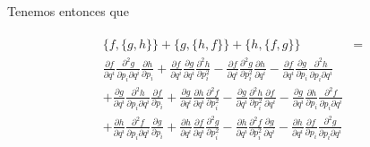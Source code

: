 \documentclass[a4paper,10pt]{article}
\numberwithin{equation}{section}
\begin{document}
Tenemos entonces que 

\begin{align}
\begin{split}
  \{f,\{g,h\}\} + \{g,\{h,f\}\} + \{h,\{f,g\}\} &= \\
  \frac{\partial f}{\partial q^i}
  \frac{\partial^2 g}{\partial p_i\partial q^i}\frac{\partial h}{\partial p_i} 
  + \frac{\partial f}{\partial q^i}
  \frac{\partial g}{\partial q^i}\frac{\partial^2 h}{\partial p_i^2} 
  -\frac{\partial f}{\partial q^i}
  \frac{\partial^2 g}{\partial p_i^2}\frac{\partial h}{\partial q^i} 
  -\frac{\partial f}{\partial q^i} 
  \frac{\partial g}{\partial p_i}\frac{\partial^2 h}{\partial p_i \partial q^i} \\
  + \frac{\partial g}{\partial q^i}
  \frac{\partial^2 h}{\partial p_i\partial q^i}\frac{\partial f}{\partial p_i} 
  + \frac{\partial g}{\partial q^i}
  \frac{\partial h}{\partial q^i}\frac{\partial^2 f}{\partial p_i^2} 
  -\frac{\partial g}{\partial q^i}
  \frac{\partial^2 h}{\partial p_i^2}\frac{\partial f}{\partial q^i} 
  -\frac{\partial g}{\partial q^i} 
  \frac{\partial h}{\partial p_i}\frac{\partial^2 f}{\partial p_i \partial q^i} \\
  + \frac{\partial h}{\partial q^i}
  \frac{\partial^2 f}{\partial p_i\partial q^i}\frac{\partial g}{\partial p_i} 
  + \frac{\partial h}{\partial q^i}
  \frac{\partial f}{\partial q^i}\frac{\partial^2 g}{\partial p_i^2} 
  -\frac{\partial h}{\partial q^i}
  \frac{\partial^2 f}{\partial p_i^2}\frac{\partial g}{\partial q^i} 
  -\frac{\partial h}{\partial q^i} 
  \frac{\partial f}{\partial p_i}\frac{\partial^2 g}{\partial p_i \partial q^i}
\end{split}
\end{align}
\end{document}
